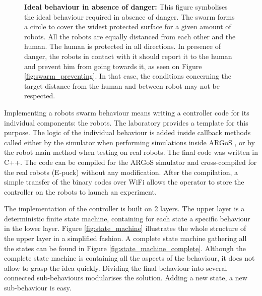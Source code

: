 \documentclass[oneside, a4paper, 12pt]{memoir}
\newcommand{\epuck}[3][0] %
{
	\draw [very thick, fill=white] (#2,#3) circle [radius=0.5];
	\draw [very thick, rotate around={#1:(#2,#3)}] (#2-0.25,#3-0.433) -- (#2,#3+0.45) -- (#2+0.25,#3-0.433);
}
\newcommand{\human}[3][0] %
{
	\draw [very thick, fill=white, rotate around={#1:(#2,#3)}] (#2-1,#3+0.5) ellipse (0.25cm and 0.5cm);
	\draw [very thick, fill=white, rotate around={#1:(#2,#3)}] (#2+1,#3+0.5) ellipse (0.25cm and 0.5cm);
	\draw [very thick, fill=white, rotate around={#1:(#2,#3)}] (#2,#3) ellipse (1.5cm and 0.75cm);
	\draw [thick, fill=white, rotate around={#1:(#2,#3)}] (#2-0.05,#3+1) -- (#2,#3+1.1) -- (#2+0.05,#3+1);
	\draw [very thick, fill=white, rotate around={#1:(#2,#3)}] (#2,#3+0.5) circle [radius=0.5cm];
}
\let\oldCaption\caption
\renewcommand{\caption}[2]{
\oldCaption[#1]{{\small\sffamily\bfseries #1:} #2}
}
\begin{document}
	\begin{figure}[!htp]\centering
	\caption{Ideal behaviour in absence of danger}{This figure symbolises the ideal behaviour required in absence of danger. The swarm forms a circle to cover the widest protected surface for a given amount of robots. All the robots are equally distanced from each other and the human. The human is protected in all directions. In presence of danger, the robots in contact with it should report it to the human and prevent him from going towards it, as seen on Figure \ref{fig:swarm_preventing}. In that case, the conditions concerning the target distance from the human and between robot may not be respected.}
	\label{fig:circle_shape}
	\end{figure}	
	
	Implementing a robots swarm behaviour means writing a controller code for its individual components: the robots. The laboratory provides a template for this purpose. The logic of the individual behaviour is added inside callback methods called either by the simulator when performing simulations inside ARGoS \citep{pinciroli2012argos}, or by the robot main method when testing on real robots. The final code was written in C++. The code can be compiled for the ARGoS simulator and cross-compiled for the real robots (E-puck) without any modification. After the compilation, a simple transfer of the binary codes over WiFi allows the operator to store the controller on the robots to launch an experiment.
	
	The implementation of the controller is built on 2 layers\label{def:implementation_layers}. The upper layer is a deterministic finite state machine, containing for each state a specific behaviour in the lower layer. Figure \ref{fig:state_machine} illustrates the whole structure of the upper layer in a simplified fashion. A complete state machine gathering all the states can be found in Figure \ref{fig:state_machine_complete}. Although the complete state machine is containing all the aspects of the behaviour, it does not allow to grasp the idea quickly. Dividing the final behaviour into several connected sub-behaviours modularises the solution. Adding a new state, a new sub-behaviour is easy.
	
\end{document}
